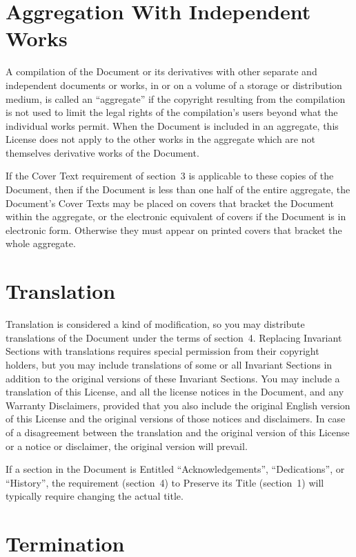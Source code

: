 \section{Aggregation With Independent Works}

A compilation of the Document or its derivatives with other separate
and independent documents or works, in or on a volume of a storage or
distribution medium, is called an ``aggregate'' if the copyright
resulting from the compilation is not used to limit the legal rights
of the compilation's users beyond what the individual works permit.
When the Document is included in an aggregate, this License does not
apply to the other works in the aggregate which are not themselves
derivative works of the Document.

If the Cover Text requirement of section~3 is applicable to these
copies of the Document, then if the Document is less than one half of
the entire aggregate, the Document's Cover Texts may be placed on
covers that bracket the Document within the aggregate, or the
electronic equivalent of covers if the Document is in electronic form.
Otherwise they must appear on printed covers that bracket the whole
aggregate.

\section{Translation}

Translation is considered a kind of modification, so you may
distribute translations of the Document under the terms of section~4.
Replacing Invariant Sections with translations requires special
permission from their copyright holders, but you may include
translations of some or all Invariant Sections in addition to the
original versions of these Invariant Sections.  You may include a
translation of this License, and all the license notices in the
Document, and any Warranty Disclaimers, provided that you also include
the original English version of this License and the original versions
of those notices and disclaimers.  In case of a disagreement between
the translation and the original version of this License or a notice
or disclaimer, the original version will prevail.

If a section in the Document is Entitled ``Acknowledgements'',
``Dedications'', or ``History'', the requirement (section~4) to Preserve
its Title (section~1) will typically require changing the actual
title.


\section{Termination}

